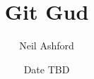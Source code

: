 \documentclass{beamer}
\title{Git Gud}
\author{Neil Ashford}
\institute{UQ Computing Society}
\date{Date TBD}
\begin{document}
\begin{frame}
\titlepage
\end{frame}
\end{document}
